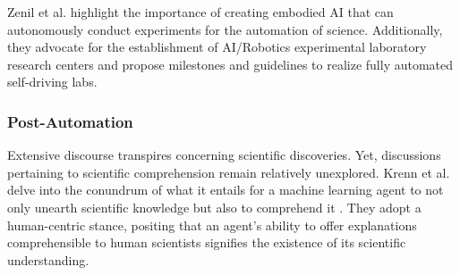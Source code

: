Zenil et al. \cite{zenil2023} highlight the importance of creating embodied AI that can autonomously conduct experiments for the automation of science. Additionally, they advocate for the establishment of AI/Robotics experimental laboratory research centers and propose milestones and guidelines to realize fully automated self-driving labs.



\subsubsection{Post-Automation}


Extensive discourse transpires concerning scientific discoveries. Yet, discussions pertaining to scientific comprehension remain relatively unexplored. Krenn et al. delve into the conundrum of what it entails for a machine learning agent to not only unearth scientific knowledge but also to comprehend it \cite{krenn2022scientific}. They adopt a human-centric stance, positing that an agent's ability to offer explanations comprehensible to human scientists signifies the existence of its scientific understanding.

